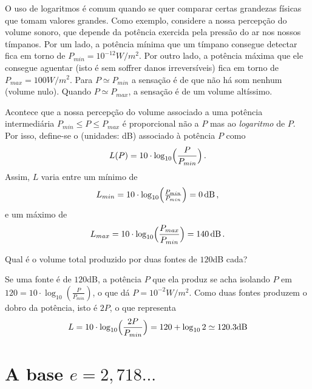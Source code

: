 \begin{obs}
O uso de logaritmos é comum quando se quer comparar certas grandezas físicas que
tomam valores grandes.
Como exemplo, considere a nossa percepção do volume sonoro, 
que depende da potência exercida pela pressão do ar nos nossos tímpanos. 
Por um lado, a potência mínima que um tímpano consegue detectar fica em torno
de $P_{min}=10^{-12}W/m^2$. 
Por outro lado, a potência máxima que ele consegue
aguentar (isto é sem soffrer danos irreversíveis) 
fica em torno de $P_{max}=100W/m^2$. 
Para $P\simeq P_{min}$ a sensação é de que não há som nenhum (volume nulo).
Quando $P\simeq P_{max}$, a sensação é de um volume altíssimo.

Acontece que a nossa percepção do volume associado a uma
potência intermediária $P_{min}\leq P\leq P_{max}$ 
é proporcional não a $P$ mas ao \emph{logaritmo} de $P$.
Por isso, define-se o  (unidades: dB) 
associado à potência $P$ como
\begin{equation}
L(P)= 10\cdot \log_{10}\Bigl(
\frac{P}{P_{min}}
\Bigr)\,.
\end{equation}
Assim, $L$ varia entre um mínimo de 
\[L_{min}=10\cdot
\log_{10}\Bigl(\tfrac{P_{min}}{P_{min}}\Bigr)=0\,\text{dB}\,,\]
e um máximo de 
\[ 
L_{max}=10\cdot \log_{10}\Bigl(\frac{P_{max}}{P_{min}}  \Bigr)=140\,\text{dB}\,.
\]
\end{obs}
\begin{exo}
Qual é o volume total produzido por duas fontes de $120$dB cada?
\begin{sol}
Se uma fonte é de $120$dB, a potência $P$ que ela produz se acha
isolando $P$ em $120=10\cdot \log_{10}(\tfrac{P}{P_{min}})$, o que dá 
$P=10^{-2}W/m^2$. 
Como duas fontes produzem o dobro da potência, isto é $2P$, o que representa 
\[L=10\cdot
\log_{10}\Bigl(\frac{2P}{P_{min}}\Bigr)=120+\log_{10}2\simeq 120.3\text{dB}\]
\end{sol}
\end{exo}

\section{A base $e=2,718...$}\label{Sec:ExpoLog}

